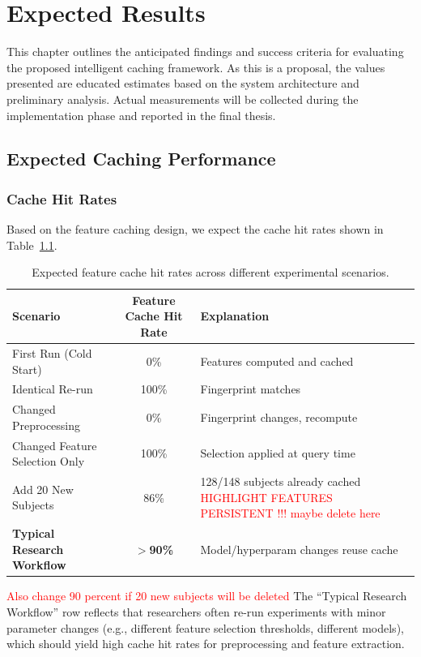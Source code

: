 \documentclass{imc-inf} %
\begin{document}
\chapter{Expected Results}

This chapter outlines the anticipated findings and success criteria for evaluating the proposed intelligent caching framework. As this is a proposal, the values presented are educated estimates based on the system architecture and preliminary analysis. Actual measurements will be collected during the implementation phase and reported in the final thesis.

\section{Expected Caching Performance}

\subsection{Cache Hit Rates}

Based on the feature caching design, we expect the cache hit rates shown in Table~\ref{tab:expected_hit_rates}.

\begin{table}[ht]
\centering
\begin{tabular}{|l|c|l|}
\hline
\textbf{Scenario} & \textbf{Feature Cache Hit Rate} & \textbf{Explanation} \\
\hline
First Run (Cold Start) & 0\% & Features computed and cached \\
\hline
Identical Re-run & 100\% & Fingerprint matches \\
\hline
Changed Preprocessing & 0\% & Fingerprint changes, recompute \\
\hline
Changed Feature Selection Only & 100\% & Selection applied at query time \\
\hline
Add 20 New Subjects & 86\% & 128/148 subjects already cached \textcolor{red}{HIGHLIGHT FEATURES PERSISTENT !!! maybe delete here}  \\
\hline
\textbf{Typical Research Workflow} & \textbf{$>$90\%} & Model/hyperparam changes reuse cache \\
\hline
\end{tabular}
\caption{Expected feature cache hit rates across different experimental scenarios.}
\label{tab:expected_hit_rates}
\end{table}
\textcolor{red}{Also change 90 percent if 20 new subjects will be deleted }
The ``Typical Research Workflow'' row reflects that researchers often re-run experiments with minor parameter changes (e.g., different feature selection thresholds, different models), which should yield high cache hit rates for preprocessing and feature extraction.
\end{document}
